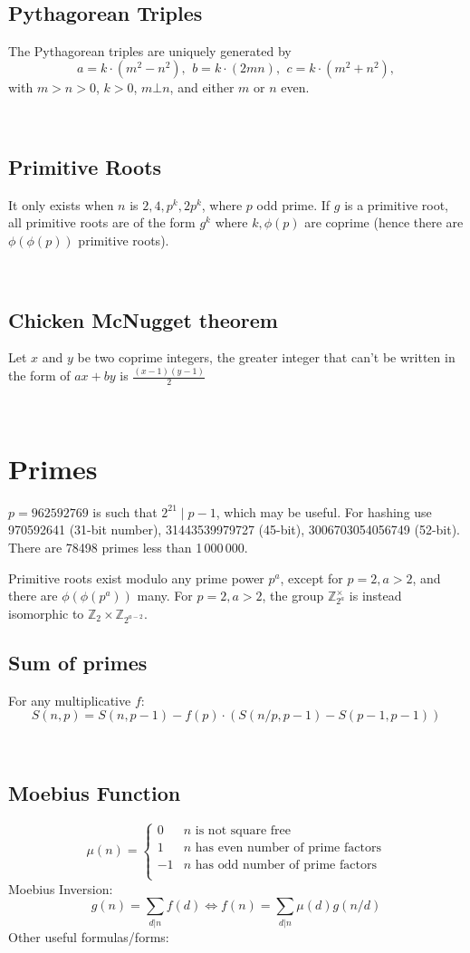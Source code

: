 \

\subsection{Pythagorean Triples}
 The Pythagorean triples are uniquely generated by
 \[ a=k\cdot (m^{2}-n^{2}),\ \,b=k\cdot (2mn),\ \,c=k\cdot (m^{2}+n^{2}), \]
 with $m > n > 0$, $k > 0$, $m \bot n$, and either $m$ or $n$ even.

\

\subsection{Primitive Roots}
	It only exists when $n$ is $2, 4, p^k, 2p^k$, where $p$ odd prime.
	If $g$ is a primitive root, all primitive roots are of the form $g^k$
	where $k,\phi(p)$ are coprime (hence there are $\phi(\phi(p))$ primitive roots).

\

\subsection{Chicken McNugget theorem}
	Let $x$ and $y$ be two coprime integers, the greater integer that can't be written in the form of $ax + by$ is $\frac{(x-1)(y-1)}{2}$

\

\section{Primes}
	$p=962592769$ is such that $2^{21} \mid p-1$, which may be useful. For hashing
	use 970592641 (31-bit number), 31443539979727 (45-bit), 3006703054056749
	(52-bit). There are 78498 primes less than 1\,000\,000.

	Primitive roots exist modulo any prime power $p^a$, except for $p = 2, a > 2$, and there are $\phi(\phi(p^a))$ many.
	For $p = 2, a > 2$, the group $\mathbb Z_{2^a}^\times$ is instead isomorphic to $\mathbb Z_2 \times \mathbb Z_{2^{a-2}}$.

\subsection{Sum of primes} For any multiplicative $f$:
                \[ S(n,p) = S(n, p-1) - f(p) \cdot (S(n/p,p-1) - S(p-1,p-1))\]

\

\subsection{Moebius Function}
\[
	\mu(n) = \begin{cases} 0 & n \textrm{ is not square free}\\ 1 & n \textrm{ has even number of prime factors}\\ -1 & n \textrm{ has odd number of prime factors}\\\end{cases}
\]
  Moebius Inversion:
  \[ g(n) = \sum_{d|n} f(d) \Leftrightarrow f(n) = \sum_{d|n} \mu(d)g(n/d) \]
  Other useful formulas/forms:

